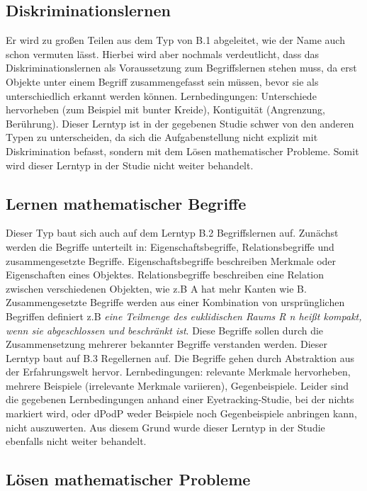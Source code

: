 \subsection[]{Diskriminationslernen}

Er wird zu großen Teilen aus dem Typ von B.1 abgeleitet, wie der Name auch schon vermuten lässt. Hierbei wird aber nochmals verdeutlicht, dass das Diskriminationslernen als Voraussetzung zum Begriffslernen stehen muss, da erst Objekte unter einem Begriff zusammengefasst sein müssen, bevor sie als unterschiedlich erkannt werden können.
Lernbedingungen: Unterschiede hervorheben (zum Beispiel mit bunter Kreide), Kontiguität (Angrenzung, Berührung)\cite{DudenKontiguitaet}.
Dieser Lerntyp ist in der gegebenen Studie schwer von den anderen Typen zu unterscheiden, da sich die Aufgabenstellung nicht explizit mit Diskrimination befasst, sondern mit dem Lösen mathematischer Probleme. Somit wird dieser Lerntyp in der Studie nicht weiter behandelt\cite{zech1983grundkurs}.

\subsection[]{Lernen mathematischer Begriffe}

Dieser Typ baut sich auch auf dem Lerntyp B.2 Begriffslernen auf. Zunächst werden die Begriffe unterteilt in: Eigenschaftsbegriffe, Relationsbegriffe und zusammengesetzte Begriffe. Eigenschaftsbegriffe beschreiben Merkmale oder Eigenschaften eines Objektes. Relationsbegriffe beschreiben eine Relation zwischen verschiedenen Objekten, wie z.B A hat mehr Kanten wie B. Zusammengesetzte Begriffe werden aus einer Kombination von ursprünglichen Begriffen definiert z.B \textit {eine Teilmenge des euklidischen Raums R n heißt kompakt, wenn sie abgeschlossen und beschränkt ist}. Diese Begriffe sollen durch die Zusammensetzung mehrerer bekannter Begriffe verstanden werden. Dieser Lerntyp baut auf B.3 Regellernen auf. Die Begriffe gehen durch Abstraktion aus der Erfahrungswelt hervor.
Lernbedingungen: relevante Merkmale hervorheben, mehrere Beispiele (irrelevante Merkmale variieren), Gegenbeispiele.
Leider sind die gegebenen Lernbedingungen anhand einer Eyetracking-Studie, bei der nichts markiert wird, oder \gls{dPodP} weder Beispiele noch Gegenbeispiele anbringen kann, nicht auszuwerten. Aus diesem Grund wurde dieser Lerntyp in der Studie ebenfalls nicht weiter behandelt\cite{zech1983grundkurs}. 

\subsection[]{Lösen mathematischer Probleme}

